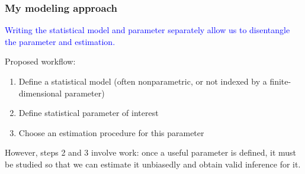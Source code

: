 \documentclass[12pt, 
hyperref={colorlinks=true, linkcolor=blue, urlcolor=cyan}]{beamer}
\begin{document}
\begin{frame}
\frametitle{My modeling approach}
\textcolor{blue}{Writing the statistical model and parameter separately allow us to disentangle the parameter and estimation.}

Proposed workflow:
\begin{enumerate}
\item Define a statistical model (often nonparametric, or not indexed by a finite-dimensional parameter)
\item Define statistical parameter of interest
\item Choose an estimation procedure for this parameter
\end{enumerate}

However, steps 2 and 3 involve work: once a useful parameter is defined, it must be studied so that we can estimate it unbiasedly and obtain valid inference for it.
\end{frame}
\end{document}
